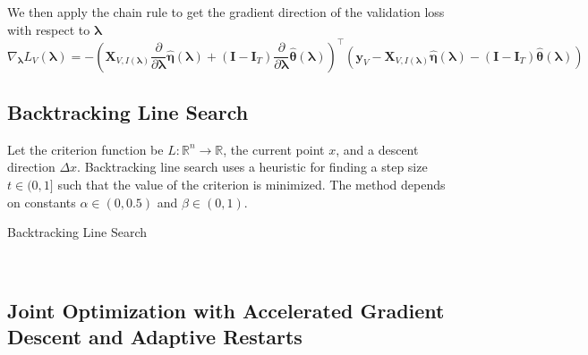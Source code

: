 \documentclass[10pt,letterpaper]{article}
\begin{document}
We then apply the chain rule to get the gradient direction of the validation loss with respect to $\boldsymbol \lambda$
\begin{equation}
\nabla_{\boldsymbol{\lambda}} L_V(\boldsymbol{\lambda}) =
- \left(
\boldsymbol{X}_{V, I(\boldsymbol\lambda)} \frac{\partial}{\partial \boldsymbol{\lambda}}\hat{\boldsymbol\eta}(\boldsymbol{\lambda})
+ (\boldsymbol I - \boldsymbol{I}_T) \frac{\partial}{\partial \boldsymbol{\lambda}}\hat{\boldsymbol\theta}(\boldsymbol{\lambda})
\right )^\top
\left (
\boldsymbol{y}_V
- \boldsymbol{X}_{V, I(\boldsymbol\lambda)} \hat{\boldsymbol\eta}(\boldsymbol{\lambda})
- (\boldsymbol I - \boldsymbol{I}_T) \hat{\boldsymbol\theta}(\boldsymbol{\lambda})
\right )
\end{equation}


\subsection{Backtracking Line Search}

Let the criterion function be $L:\mathbb{R}^n \rightarrow \mathbb{R}$, the current point $x$, and a descent direction $\Delta x$. Backtracking line search uses a heuristic for finding a step size $t \in (0,1]$ such that the value of the criterion is minimized. The method depends on constants $\alpha  \in (0, 0.5)$ and $\beta \in (0,1)$.

\begin{algorithm}
\caption{Backtracking Line Search}
\label{alg:backtracking}
         \begin{algorithmic}
  	 \\
	\ENDWHILE
	\end{algorithmic}
\end{algorithm}

\subsection{Joint Optimization with Accelerated Gradient Descent and Adaptive Restarts}
\end{document}
